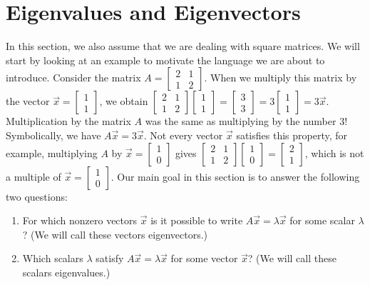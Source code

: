 \section{Eigenvalues and Eigenvectors}
In this section, we also assume that we are dealing with square matrices.  We will start by looking at an example to motivate the language we are about to introduce.  Consider the matrix
$A=\begin{bmatrix} 2&1\\1&2\end{bmatrix} $.  When we multiply this matrix by the vector 
$\vec x = \begin{bmatrix} 1\\1\end{bmatrix} $, 
we obtain 
$\begin{bmatrix} 2&1\\1&2\end{bmatrix} \begin{bmatrix} 1\\1\end{bmatrix} = \begin{bmatrix} 3\\3\end{bmatrix}=3 \begin{bmatrix} 1\\1\end{bmatrix}=3\vec x$. Multiplication by the matrix $A$ was the same as multiplying by the number 3! Symbolically, we have $A\vec x = 3\vec x$. 
Not every vector $\vec x$ satisfies this property, for example, multiplying $A$ by 
$\vec x = \begin{bmatrix} 1\\0\end{bmatrix} $ 
gives  
$\begin{bmatrix} 2&1\\1&2\end{bmatrix} \begin{bmatrix} 1\\0\end{bmatrix} = \begin{bmatrix} 2\\1\end{bmatrix}$, which is not a multiple of $\vec x = \begin{bmatrix} 1\\0\end{bmatrix} $. Our main goal in this section is to answer the following two questions:
\begin{enumerate}
	\item For which nonzero vectors $\vec x$ is it possible to write $A\vec x = \lambda \vec x$ for some scalar $\lambda$? (We will call these vectors eigenvectors.)
	\item Which scalars $\lambda$ satisfy $A\vec x = \lambda \vec x$ for some vector $\vec x$? (We will call these scalars eigenvalues.)
\end{enumerate}

